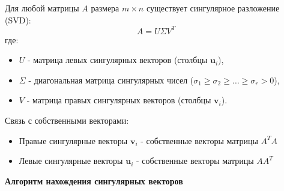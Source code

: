 \documentclass[a4paper, 12pt]{report}
\begin{document}
Для любой матрицы $A$ размера $m \times n$ существует {сингулярное разложение} (SVD):
\[
A = U \Sigma V^T
\]
где:
\begin{itemize}
    \item $U$ - матрица {левых сингулярных векторов} (столбцы $\mathbf{u}_i$),
    \item $\Sigma$ - диагональная матрица {сингулярных чисел} ($\sigma_1 \geq \sigma_2 \geq \dots \geq \sigma_r > 0$),
    \item $V$ - матрица {правых сингулярных векторов} (столбцы $\mathbf{v}_i$).
\end{itemize} 
Связь с собственными векторами:
\begin{itemize}
    \item Правые сингулярные векторы $\mathbf{v}_i$ - собственные векторы матрицы $A^T A$
    \item Левые сингулярные векторы $\mathbf{u}_i$ - собственные векторы матрицы $A A^T$
\end{itemize}
\endgroup


\textbf{Алгоритм нахождения сингулярных векторов}
\end{document}
